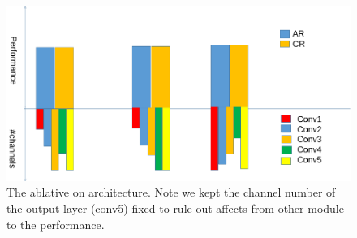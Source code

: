 \begin{figure}[!t]
	\centering
	\includegraphics[width=\linewidth]{figures/archabl.png}
	\caption
    {The ablative on architecture. Note we kept the channel number of the output layer (conv5) fixed to rule out affects from other module to the performance.}
	\label{fig:archabl}
\end{figure}